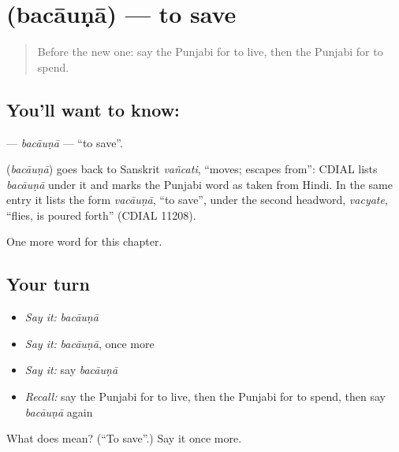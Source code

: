 \section[\texorpdfstring{\pa{ਬਚਾਉਣਾ} (bacāuṇā)}{ਬਚਾਉਣਾ (bacāuṇā)}]{ (bacāuṇā) — to save}

\label{lesson:PA-C151-bacauna}



\begin{quote}
Before the new one: say the Punjabi for to live, then the Punjabi for to spend.
\end{quote}

\subsection*{You'll want to know: }
\textbf{} — \emph{bacāuṇā} — \textquotedblleft{}to save\textquotedblright{}.

\begin{cousinweb}
\textbf{} (\emph{bacāuṇā}) goes back to Sanskrit \emph{vañcati}, \textquotedblleft{}moves; escapes from\textquotedblright{}: CDIAL lists \emph{bacāuṇā} under it and marks the Punjabi word as taken from Hindi. In the same entry it lists the form \emph{vacāuṇā}, \textquotedblleft{}to save\textquotedblright{}, under the second headword, \emph{vacyate}, \textquotedblleft{}flies, is poured forth\textquotedblright{} (CDIAL 11208).
\end{cousinweb}

\begin{grammarlens}[title={What you've built}]
One more word for this chapter.
\end{grammarlens}

\subsection*{Your turn}
\begin{itemize}
\raggedright
  \item \emph{Say it:} \emph{bacāuṇā}
  \item \emph{Say it:} \emph{bacāuṇā}, once more
  \item \emph{Say it:} say \emph{bacāuṇā}
  \item \emph{Recall:} say the Punjabi for to live, then the Punjabi for to spend, then say \emph{bacāuṇā} again
\end{itemize}

\begin{tcolorbox}[breakable,colback=teal!4,colframe=teal!35!black,title={Before you move on}]
What does  mean? (\textquotedblleft{}To save\textquotedblright{}.) Say it once more.
\end{tcolorbox}
